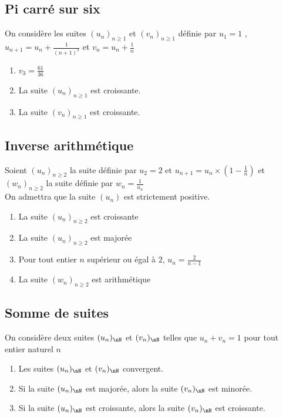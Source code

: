 \documentclass[oneside,12pt]{article}
\begin{document}
\subsection{Pi carré sur six}
On considère les suites $(u_n)_{n\geq1}$ et $(v_n)_{n\geq1}$ définie par $u_1=1$ , $u_{n+1}=u_n+\frac{1}{(n+1)^2}$ et $v_n=u_n+\frac{1}{n}$
\begin{enumerate}
	\item $v_3=\frac{61}{36}$
	\item La suite $(u_n)_{n\geq1}$ est croissante.
	\item La suite $(v_n)_{n\geq1}$ est croissante.
\end{enumerate}



\subsection{Inverse arithmétique}
Soient $(u_n)_{n\geq2}$ la suite définie par $u_2=2$ et $u_{n+1}=u_n\times(1-\frac{1}{n})$ et $(w_n)_{n\geq2}$ la suite définie par $w_n=\frac{1}{u_n}$\\
On admettra que la suite $(u_n)$ est strictement positive.
\begin{enumerate}
    \item La suite $(u_n)_{n\geq2}$ est croissante
    \item La suite $(u_n)_{n\geq2}$ est majorée
    \item Pour tout entier $n$ supérieur ou égal à $2$, $u_n=\frac{2}{n-1}$
    \item La suite $(w_n)_{n\geq2}$ est arithmétique
\end{enumerate}



\subsection{Somme de suites}
On considère deux suites $(u_n)_{\nN}$ et $(v_n)_{\nN}$ telles que $u_n+v_n=1$ pour tout entier naturel $n$
\begin{enumerate}
	\item Les suites $(u_n)_{\nN}$ et $(v_n)_{\nN}$ convergent.
	\item Si la suite $(u_n)_{\nN}$ est majorée, alors la suite $(v_n)_{\nN}$ est minorée.
	\item Si la suite $(u_n)_{\nN}$ est croissante, alors la suite $(v_n)_{\nN}$ est croissante.
\end{enumerate}
\end{document}
